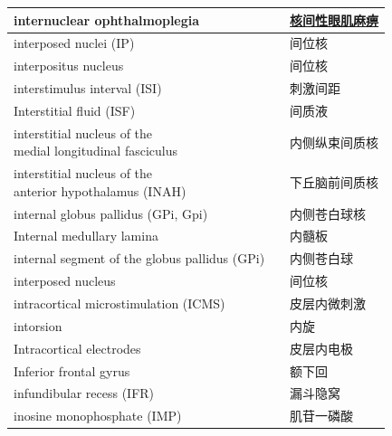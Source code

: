 \begin{longtable}{lll}
	\midrule
	internuclear ophthalmoplegia  && \href{https://chuangshi.qq.com/read/27611642/12}{核间性眼肌麻痹}  \\
	
	\midrule
	interposed nuclei (IP)  && 间位核  \\
	
	\midrule
	interpositus nucleus  && 间位核  \\
	
	\midrule
	interstimulus interval (ISI)  && 刺激间距  \\
	
	\midrule
	Interstitial fluid (ISF)  && 间质液  \\
	
	\midrule
	\makecell[l]{interstitial nucleus of the \\medial longitudinal fasciculus}   && 内侧纵束间质核  \\
	
	\midrule
	\makecell[l]{interstitial nucleus of the \\anterior hypothalamus  (INAH)} && 下丘脑前间质核  \\
	
	\midrule
	internal globus pallidus (GPi, Gpi)  && 内侧苍白球核  \\
	
	\midrule
	Internal medullary lamina  && 内髓板  \\
	
	\midrule
	internal segment of the globus pallidus (GPi) && 内侧苍白球  \\
	
	\midrule
	interposed nucleus && 间位核  \\
	
	\midrule
	intracortical microstimulation (ICMS)  && 皮层内微刺激  \\
	
	\midrule
	intorsion   && 内旋  \\
	
	\midrule
	Intracortical electrodes   && 皮层内电极  \\
	
	\midrule
	Inferior frontal gyrus   && 额下回  \\
	
	\midrule
	infundibular recess (IFR)   && 漏斗隐窝  \\
	
	\midrule
	inosine monophosphate (IMP)  && 肌苷一磷酸  \\
	

\end{longtable}
